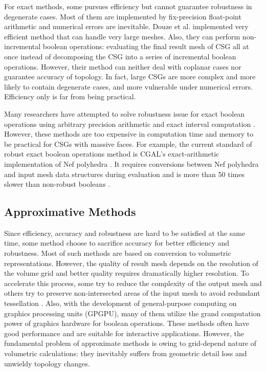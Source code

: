\documentclass[10pt,journal,compsoc]{IEEEtran}
\begin{document}
For exact methods, some \cite{ogayar2015deferred,douze2015quickcsg,zhou2016mesh,xu2013fast,feito2013fast} pursues efficiency but cannot guarantee robustness in degenerate cases. Most of them are implemented by fix-precision float-point arithmetic and numerical errors are inevitable. Douze et al. \cite{douze2015quickcsg} implemented very efficient method that can handle very large meshes. Also, they can perform non-incremental boolean operations: evaluating the final result mesh of CSG all at once instead of decomposing the CSG into a series of incremental boolean operations. However, their method can neither deal with coplanar cases nor guarantee accuracy of topology. In fact, large CSGs are more complex and more likely to contain degenerate cases, and more vulnerable under numerical errors. Efficiency only is far from being practical.


Many researchers have attempted to solve robustness issue for exact boolean operations using arbitrary precision arithmetic \cite{banerjee1996topologically, fortune1995polyhedral, keyser2004esolid, granados2003boolean, hachenberger2005boolean} and exact interval computation \cite{fang1993robustness, hu1996robust, segal1990using}. However, these methods are too expensive in computation time and memory to be practical for CSGs with massive faces. For example, the current standard of robust exact boolean operations method is CGAL's \cite{cgal:hk-bonp3-15a} exact-arithmetic implementation \cite{granados2003boolean} of Nef polyhedra \cite{bieri1988elementary}. It requires conversions between Nef polyhedra and input mesh data structures during evaluation and is more than 50 times slower than non-robust booleans \cite{bernstein2009fast}.


\subsection{Approximative Methods}

Since efficiency, accuracy and robustness are hard to be satisfied at the same time, some method choose to sacrifice accuracy for better efficiency and robustness. Most of such methods are based on conversion to volumetric representations. However, the quality of result mesh depends on the resolution of the volume grid and better quality requires dramatically higher resolution. To accelerate this process, some try to reduce the complexity of the output mesh \cite{varadhan2004topology} and others try to preserve non-intersected areas of the input mesh to avoid redundant tessellation \cite{pavic2010hybrid,wang2011approximate,zhao2011parallel,hable2005blister,ogayar2006gpu}. Also, with the development of general-purpose computing on graphics processing units (GPGPU), many of them utilize the grand computation power of graphics hardware for boolean operations. These methods often have good performance and are suitable for interactive applications. However, the fundamental problem of approximate methods is owing to grid-depend nature of volumetric calculations: they inevitably suffers from geometric detail loss and unwieldy topology changes.
\end{document}
